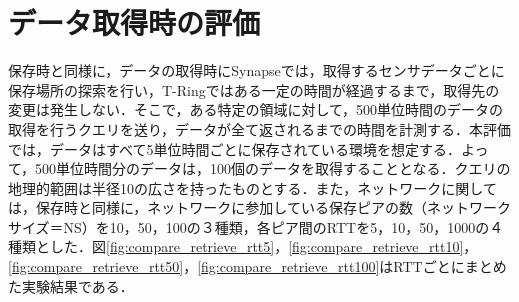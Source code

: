 



\section{データ取得時の評価}
保存時と同様に，データの取得時にSynapseでは，取得するセンサデータごとに保存場所の探索を行い，T-Ringではある一定の時間が経過するまで，取得先の変更は発生しない．そこで，ある特定の領域に対して，500単位時間のデータの取得を行うクエリを送り，データが全て返されるまでの時間を計測する．本評価では，データはすべて5単位時間ごとに保存されている環境を想定する．よって，500単位時間分のデータは，100個のデータを取得することとなる．クエリの地理的範囲は半径10の広さを持ったものとする．また，ネットワークに関しては，保存時と同様に，ネットワークに参加している保存ピアの数（ネットワークサイズ＝NS）を10，50，100の３種類，各ピア間のRTTを5，10，50，1000の４種類とした．図\ref{fig:compare_retrieve_rtt5}，\ref{fig:compare_retrieve_rtt10}，\ref{fig:compare_retrieve_rtt50}，\ref{fig:compare_retrieve_rtt100}はRTTごとにまとめた実験結果である．


